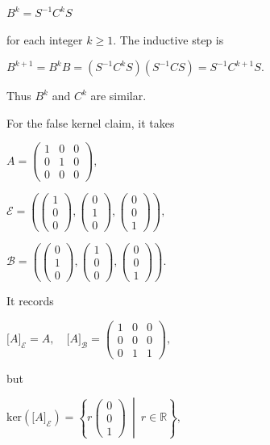\(B^{k} = S^{- 1}C^{k}S\)

for each integer \(k \geq 1\). The inductive step is

\(B^{k + 1} = B^{k}B = \left( {S^{- 1}C^{k}S} \right)\left( {S^{- 1}CS} \right) = S^{- 1}C^{k + 1}S.\)

Thus \(B^{k}\) and \(C^{k}\) are similar.

For the false kernel claim, it takes

\(A = \begin{pmatrix}
1 & 0 & 0 \\
0 & 1 & 0 \\
0 & 0 & 0
\end{pmatrix},\)

\(\mathcal{E} = \left( {\begin{pmatrix}
1 \\
0 \\
0
\end{pmatrix},\begin{pmatrix}
0 \\
1 \\
0
\end{pmatrix},\begin{pmatrix}
0 \\
0 \\
1
\end{pmatrix}} \right),\)

\(\mathcal{B} = \left( {\begin{pmatrix}
0 \\
1 \\
0
\end{pmatrix},\begin{pmatrix}
1 \\
0 \\
0
\end{pmatrix},\begin{pmatrix}
0 \\
0 \\
1
\end{pmatrix}} \right).\)

It records

\(\lbrack A\rbrack_{\mathcal{E}} = A,\quad\lbrack A\rbrack_{\mathcal{B}} = \begin{pmatrix}
1 & 0 & 0 \\
0 & 0 & 0 \\
0 & 1 & 1
\end{pmatrix},\)

but

\(\text{ker}\left( \lbrack A\rbrack_{\mathcal{E}} \right) = \left\{ r\begin{pmatrix}
0 \\
0 \\
1
\end{pmatrix}\  \middle| \ r \in \mathbb{R} \right\},\)

